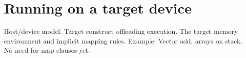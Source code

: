 
\chapter{Running on a target device}
Host/device model.
Target construct offloading execution.
The target memory environment and implicit mapping rules.
Example: Vector add. arrays on stack. No need for map clauses yet.
